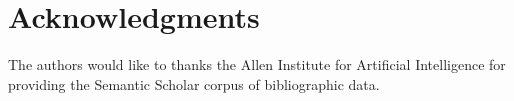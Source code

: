\documentclass[11pt,a4paper,openany,oneside]{book}
\theoremstyle{definition}
\begin{document}
	
	
	
    
	
	
	
	
	

    
    
    
    
    
    
    \chapter*{Acknowledgments}

The authors would like to thanks the Allen Institute for Artificial Intelligence for providing the Semantic Scholar corpus of bibliographic data.


%    
\newpage


%    
\end{document}
